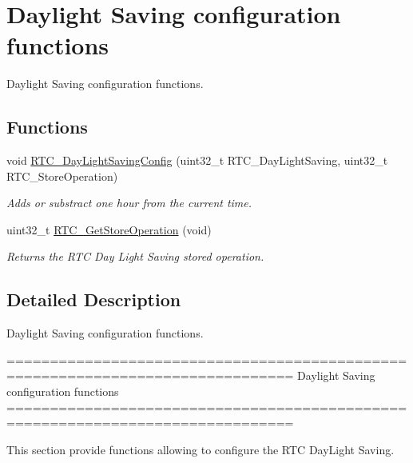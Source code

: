 \hypertarget{group___r_t_c___group5}{\section{Daylight Saving configuration functions}
\label{group___r_t_c___group5}
}


Daylight Saving configuration functions.  


\subsection*{Functions}
\begin{DoxyCompactItemize}
\item 
void \hyperlink{group___r_t_c___group5_ga812feddea77990b5dc336a4989ae61b8}{R\-T\-C\-\_\-\-Day\-Light\-Saving\-Config} (uint32\-\_\-t R\-T\-C\-\_\-\-Day\-Light\-Saving, uint32\-\_\-t R\-T\-C\-\_\-\-Store\-Operation)
\begin{DoxyCompactList}\small\item\em Adds or substract one hour from the current time. \end{DoxyCompactList}\item 
uint32\-\_\-t \hyperlink{group___r_t_c___group5_gaba0c1361790203e9dca43846f0d9bc15}{R\-T\-C\-\_\-\-Get\-Store\-Operation} (void)
\begin{DoxyCompactList}\small\item\em Returns the R\-T\-C Day Light Saving stored operation. \end{DoxyCompactList}\end{DoxyCompactItemize}


\subsection{Detailed Description}
Daylight Saving configuration functions. \begin{DoxyVerb} ===============================================================================
                    Daylight Saving configuration functions
 ===============================================================================  

  This section provide functions allowing to configure the RTC DayLight Saving.\end{DoxyVerb}
 

